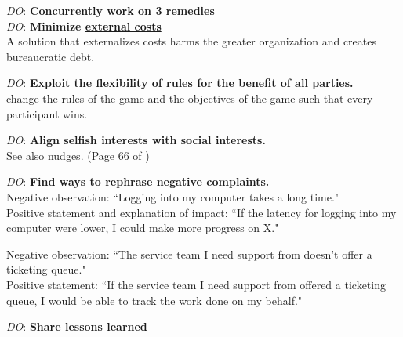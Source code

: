 \textit{DO}: \textbf{Concurrently work on 3 remedies}\\


\textit{DO}: \textbf{Minimize \href{https://en.wikipedia.org/wiki/Externality}{external costs}}\\
A solution that externalizes costs harms the greater organization and creates bureaucratic debt.


\textit{DO}: \textbf{Exploit the flexibility of rules for the benefit of all parties.}\\
change the rules of the game and the objectives of the game such that every participant wins.

\textit{DO}: \textbf{Align selfish interests with social interests.}\\
See also nudges. 
(Page 66 of \cite{2012_Schneier})

\textit{DO}: \textbf{Find ways to rephrase negative complaints.}\\
Negative observation: ``Logging into my computer takes a long time."\\
Positive statement and explanation of impact: ``If the latency for logging into my computer were lower, I could make more progress on X."


Negative observation: ``The service team I need support from doesn't offer a ticketing queue."\\
Positive statement: ``If the service team I need support from offered a ticketing queue, I would be able to track the work done on my behalf."

\textit{DO}: \textbf{Share lessons learned}\\